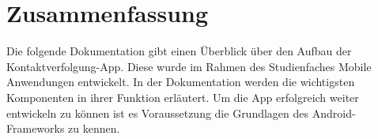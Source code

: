 \documentclass[
a4paper,     %
12pt         %
]{scrartcl}  %
\begin{document}

\thispagestyle{empty}  %
 \maketitle
 \thispagestyle{empty}

 \newpage
\section*{Zusammenfassung}
Die folgende Dokumentation gibt einen Überblick über den Aufbau der Kontaktverfolgung-App. Diese wurde im Rahmen des Studienfaches Mobile Anwendungen entwickelt. In der Dokumentation werden die wichtigsten Komponenten in ihrer Funktion erläutert. Um die App erfolgreich weiter entwickeln zu können ist es Voraussetzung die Grundlagen des Android-Frameworks zu kennen.
\setcounter{tocdepth}{1}
 \thispagestyle{empty}
 \tableofcontents



\newpage



\newpage




\end{document}
